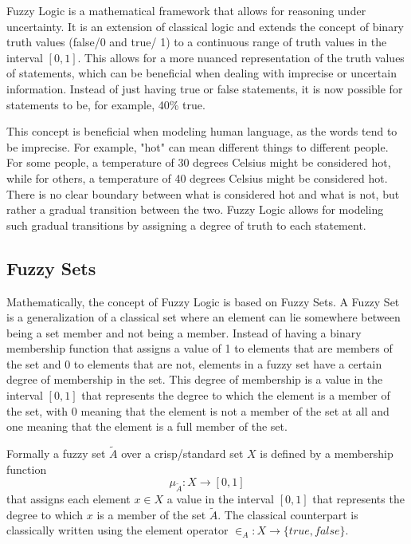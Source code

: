 Fuzzy Logic is a mathematical framework that allows for reasoning under uncertainty. It is an extension of classical logic and extends the concept of binary truth values (false/0 and true/ 1) to a continuous range of truth values in the interval $[0, 1]$. This allows for a more nuanced representation of the truth values of statements, which can be beneficial when dealing with imprecise or uncertain information. Instead of just having true or false statements, it is now possible for statements to be, for example, 40\% true.

This concept is beneficial when modeling human language, as the words tend to be imprecise. For example, "hot" can mean different things to different people. For some people, a temperature of 30 degrees Celsius might be considered hot, while for others, a temperature of 40 degrees Celsius might be considered hot. There is no clear boundary between what is considered hot and what is not, but rather a gradual transition between the two. Fuzzy Logic allows for modeling such gradual transitions by assigning a degree of truth to each statement.



\subsection{Fuzzy Sets}

Mathematically, the concept of Fuzzy Logic is based on Fuzzy Sets. A Fuzzy Set is a generalization of a classical set where an element can lie somewhere between being a set member and not being a member. Instead of having a binary membership function that assigns a value of 1 to elements that are members of the set and 0 to elements that are not, elements in a fuzzy set have a certain degree of membership in the set. This degree of membership is a value in the interval $[0, 1]$ that represents the degree to which the element is a member of the set, with 0 meaning that the element is not a member of the set at all and one meaning that the element is a full member of the set.


Formally a fuzzy set $\tilde{A}$ over a crisp/standard set $X$ is defined by a membership function
\begin{equation}
      \mu_{\tilde{A}}: X \rightarrow [0, 1]
\end{equation}
that assigns each element $x \in X$ a value in the interval $[0, 1]$ that represents the degree to which $x$ is a member of the set $\tilde{A}$. The classical counterpart is classically written using the element operator $\in_A: X \rightarrow \{true, false\}$.

